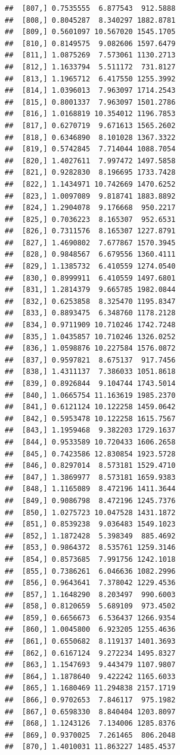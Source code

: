 \documentclass[article]{jss}\usepackage[]{graphicx}\usepackage[]{xcolor}
\makeatletter
\newenvironment{kframe}{%
 \def\at@end@of@kframe{}%
 \ifinner\ifhmode%
  \def\at@end@of@kframe{\end{minipage}}%
  \begin{minipage}{\columnwidth}%
 \fi\fi%
 \def\FrameCommand##1{\hskip\@totalleftmargin \hskip-\fboxsep
 \colorbox{shadecolor}{##1}\hskip-\fboxsep
     \hskip-\linewidth \hskip-\@totalleftmargin \hskip\columnwidth}%
 \MakeFramed {\advance\hsize-\width
   \@totalleftmargin\z@ \linewidth\hsize
   \@setminipage}}%
 {\par\unskip\endMakeFramed%
 \at@end@of@kframe}
\newenvironment{knitrout}{}{} %
\makeatother
\begin{document}
\begin{knitrout}
\begin{kframe}
\begin{verbatim}
##  [807,] 0.7535555  6.877543  912.5888
##  [808,] 0.8045287  8.340297 1882.8781
##  [809,] 0.5601097 10.567020 1545.1705
##  [810,] 0.8149575  9.082606 1597.6479
##  [811,] 1.0875269  7.573061 1130.2713
##  [812,] 1.1633794  5.511172  731.8127
##  [813,] 1.1965712  6.417550 1255.3992
##  [814,] 1.0396013  7.963097 1714.2543
##  [815,] 0.8001337  7.963097 1501.2786
##  [816,] 1.0168819 10.354012 1196.7853
##  [817,] 0.6270719  9.671613 1565.2602
##  [818,] 0.6346890  8.101028 1367.3322
##  [819,] 0.5742845  7.714044 1088.7054
##  [820,] 1.4027611  7.997472 1497.5858
##  [821,] 0.9282830  8.196695 1733.7428
##  [822,] 1.1434971 10.742669 1470.6252
##  [823,] 1.0097089  9.818741 1883.8892
##  [824,] 1.2904078  9.176668  950.2217
##  [825,] 0.7036223  8.165307  952.6531
##  [826,] 0.7311576  8.165307 1227.8791
##  [827,] 1.4690802  7.677867 1570.3945
##  [828,] 0.9848567  6.679556 1360.4111
##  [829,] 1.1385732  6.410559 1274.0540
##  [830,] 0.8999911  6.410559 1497.6801
##  [831,] 1.2814379  9.665785 1982.0844
##  [832,] 0.6253858  8.325470 1195.8347
##  [833,] 0.8893475  6.348760 1178.2128
##  [834,] 0.9711909 10.710246 1742.7248
##  [835,] 1.0435857 10.710246 1326.0252
##  [836,] 1.0598876 10.227584 1576.0872
##  [837,] 0.9597821  8.675137  917.7456
##  [838,] 1.4311137  7.386033 1051.8618
##  [839,] 0.8926844  9.104744 1743.5014
##  [840,] 1.0665754 11.163619 1985.2370
##  [841,] 0.6121124 10.122258 1459.0642
##  [842,] 0.5953478 10.122258 1615.7567
##  [843,] 1.1959468  9.382203 1729.1637
##  [844,] 0.9533589 10.720433 1606.2658
##  [845,] 0.7423586 12.830854 1923.5728
##  [846,] 0.8297014  8.573181 1529.4710
##  [847,] 1.3869977  8.573181 1659.9383
##  [848,] 1.1165089  8.472196 1411.3644
##  [849,] 0.9086798  8.472196 1245.7376
##  [850,] 1.0275723 10.047528 1431.1872
##  [851,] 0.8539238  9.036483 1549.1023
##  [852,] 1.1872428  5.398349  885.4692
##  [853,] 0.9864372  8.535761 1259.3146
##  [854,] 0.8573685  7.991756 1242.1018
##  [855,] 0.7386261  6.046636 1082.2996
##  [856,] 0.9643641  7.378042 1229.4536
##  [857,] 1.1648290  8.203497  990.6003
##  [858,] 0.8120659  5.689109  973.4502
##  [859,] 0.6656673  6.536437 1266.9354
##  [860,] 1.0045800  6.923205 1255.4636
##  [861,] 0.6550682  8.119137 1401.3693
##  [862,] 0.6167124  9.272234 1495.8327
##  [863,] 1.1547693  9.443479 1107.9807
##  [864,] 1.1878640  9.422242 1165.6033
##  [865,] 1.1680469 11.294838 2157.1719
##  [866,] 0.9702653  7.846117  975.1982
##  [867,] 0.6598330  8.840404 1203.8097
##  [868,] 1.1243126  7.134006 1285.8376
##  [869,] 0.9370025  7.261465  806.2048
##  [870,] 1.4010031 11.863227 1485.4537

\end{verbatim}
\end{kframe}
\end{knitrout}
\end{document}
